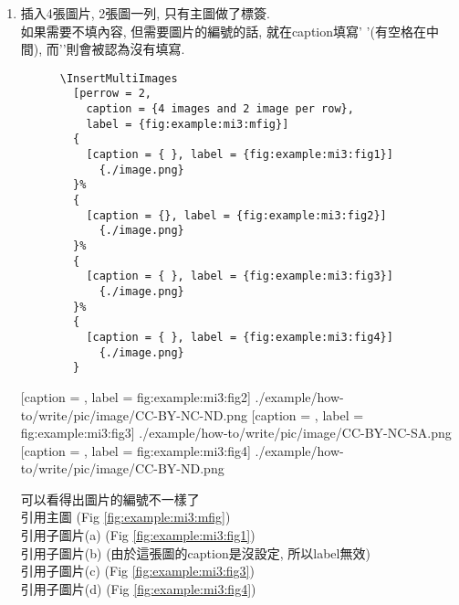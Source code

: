 \begin{enumerate}
{      e.g: 
      引用主圖 (Fig \ref{fig:example:mi2:mfig}) ,
      引用子圖片 (Fig \ref{fig:example:mi2:fig1}, Fig \ref{fig:example:mi2:fig2}).
    } %

    \newpage
    \item
    {
      插入4張圖片, 2張圖一列, 只有主圖做了標簽.\\
      如果需要不填內容, 但需要圖片的編號的話, 就在caption填寫'{ }'(有空格在中間), 而'{}'則會被認為沒有填寫.
      \begin{verbatim}
      \InsertMultiImages
        [perrow = 2,
          caption = {4 images and 2 image per row},
          label = {fig:example:mi3:mfig}]
        {
          [caption = { }, label = {fig:example:mi3:fig1}]
            {./image.png}
        }%
        {
          [caption = {}, label = {fig:example:mi3:fig2}]
            {./image.png}
        }%
        {
          [caption = { }, label = {fig:example:mi3:fig3}]
            {./image.png}
        }%
        {
          [caption = { }, label = {fig:example:mi3:fig4}]
            {./image.png}
        }
      \end{verbatim}

        {
          [caption = {},
          label = {fig:example:mi3:fig2}]
            {./example/how-to/write/pic/image/CC-BY-NC-ND.png}
        }%
        {
          [caption = { },
          label = {fig:example:mi3:fig3}]
            {./example/how-to/write/pic/image/CC-BY-NC-SA.png}
        }%
        {
          [caption = { },
          label = {fig:example:mi3:fig4}]
            {./example/how-to/write/pic/image/CC-BY-ND.png}
        }

      可以看得出圖片的編號不一樣了\\
      引用主圖 (Fig \ref{fig:example:mi3:mfig})\\
      引用子圖片(a) (Fig \ref{fig:example:mi3:fig1})\\
      引用子圖片(b) (由於這張圖的caption是沒設定, 所以label無效)\\
      引用子圖片(c) (Fig \ref{fig:example:mi3:fig3})\\
      引用子圖片(d) (Fig \ref{fig:example:mi3:fig4})
    } %


\end{enumerate}
